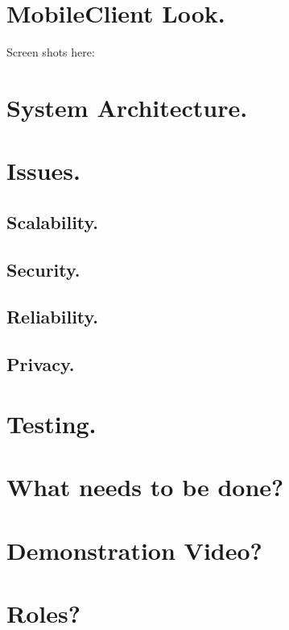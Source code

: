 \documentclass[10pt,a4paper]{article}
\begin{document}
\section*{MobileClient Look.}
Screen shots here:
\newpage
\section*{System Architecture.}
\newpage
\section*{Issues.}
\subsection*{Scalability.}
\subsection*{Security.}
\subsection*{Reliability.}
\subsection*{Privacy.}
\newpage
\section*{Testing.}

\newpage
\section*{What needs to be done?}

\newpage
\section*{Demonstration Video?}

\newpage
\section*{Roles?}
\end{document}
